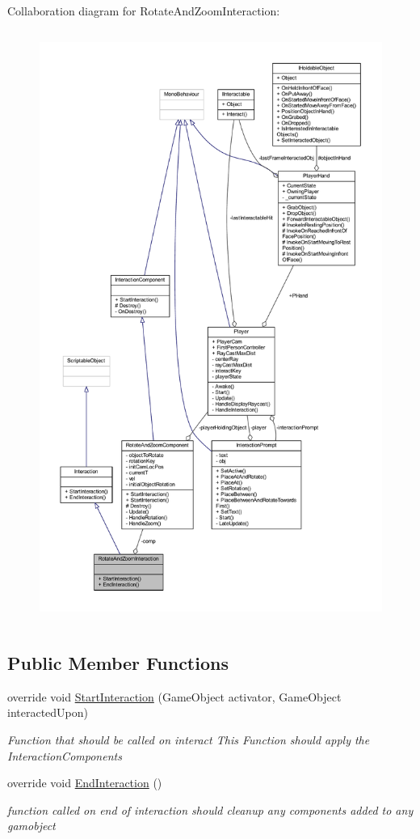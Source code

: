 Collaboration diagram for Rotate\+And\+Zoom\+Interaction\+:
\nopagebreak
\begin{figure}[H]
\begin{center}
\leavevmode
\includegraphics[height=550pt]{class_rotate_and_zoom_interaction__coll__graph}
\end{center}
\end{figure}
\subsection*{Public Member Functions}
\begin{DoxyCompactItemize}
\item 
override void \mbox{\hyperlink{class_rotate_and_zoom_interaction_ad92e1c40e9cbb2fb3dcf234e72d0e595}{Start\+Interaction}} (Game\+Object activator, Game\+Object interacted\+Upon)
\begin{DoxyCompactList}\small\item\em Function that should be called on interact This Function should apply the Interaction\+Components \end{DoxyCompactList}\item 
override void \mbox{\hyperlink{class_rotate_and_zoom_interaction_af0c13721da9fee4e1f7ce226d4cf7bea}{End\+Interaction}} ()
\begin{DoxyCompactList}\small\item\em function called on end of interaction should cleanup any components added to any gamobject \end{DoxyCompactList}\end{DoxyCompactItemize}
